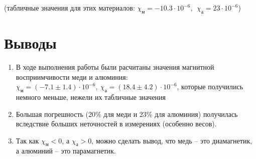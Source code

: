 \documentclass[a4paper,14pt]{article}
\begin{document}
(табличные значения для этих материалов: $\chi_{\text{м}} = -10.3 \cdot 10^{-6}, \ \  \chi_{\text{а}} = 23 \cdot 10^{-6}$)

\section*{Выводы}
\begin{enumerate}
	\item В ходе выполнения работы были расчитаны значения магнитной восприимчивости меди и алюминия: $\chi_{\text{м}} = (-7.1 \pm 1.4) \cdot 10^{-6}, \  \chi_{\text{а}} = (18.4 \pm 4.2) \cdot 10^{-6}$, которые получились немного меньше, нежели их табличные значения
	\item Большая погрешность (20\% для меди и 23\% для алюминия) получилась вследствие больших неточностей в измерениях (особенно весов).
	\item Так как $\chi_{\text{м}} < 0$, а $\chi_{\text{а}} > 0$, можно сделать вывод, что медь -- это диамагнетик, а алюминий -- это парамагнетик.
\end{enumerate}
\end{document}
